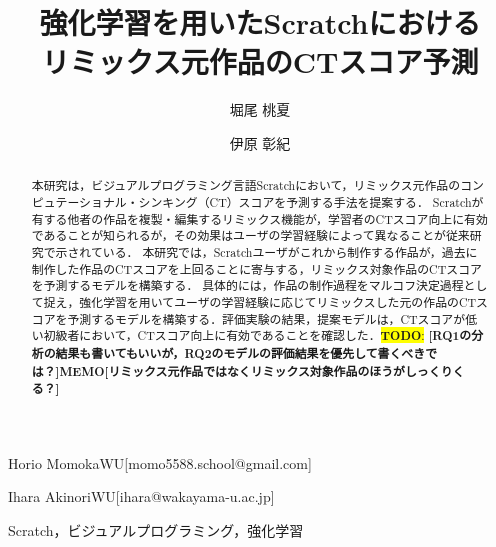 \documentclass[submit,techrep,noauthor]{ipsj}
\newcommand{\todo}[1]{\colorbox{yellow}{{\bf TODO}:}{\color{red} {\textbf{[#1]}}}}
\newcommand{\memo}[1]{\colorbox{magenta!30}{\textbf{MEMO}}{\color{red!50}\textbf{[#1]}}}
\begin{document}
\title{強化学習を用いたScratchにおける\\
リミックス元作品のCTスコア予測}





\author{堀尾 桃夏}{Horio Momoka}{WU}[momo5588.school@gmail.com]
\author{伊原 彰紀}{Ihara Akinori}{WU}[ihara@wakayama-u.ac.jp]

\begin{abstract}
本研究は，ビジュアルプログラミング言語Scratchにおいて，リミックス元作品のコンピュテーショナル・シンキング（CT）スコアを予測する手法を提案する．
Scratchが有する他者の作品を複製・編集するリミックス機能が，学習者のCTスコア向上に有効であることが知られるが，その効果はユーザの学習経験によって異なることが従来研究で示されている．
本研究では，Scratchユーザがこれから制作する作品が，過去に制作した作品のCTスコアを上回ることに寄与する，リミックス対象作品のCTスコアを予測するモデルを構築する．
具体的には，作品の制作過程をマルコフ決定過程として捉え，強化学習を用いてユーザの学習経験に応じてリミックスした元の作品のCTスコアを予測するモデルを構築する．評価実験の結果，提案モデルは，CTスコアが低い初級者において，CTスコア向上に有効であることを確認した．\todo{RQ1の分析の結果も書いてもいいが，RQ2のモデルの評価結果を優先して書くべきでは？}\memo{リミックス元作品ではなくリミックス対象作品のほうがしっくりくる？}
\end{abstract}


%
\begin{jkeyword}
    {Scratch，ビジュアルプログラミング，強化学習}
\end{jkeyword}
%

%
\end{document}

